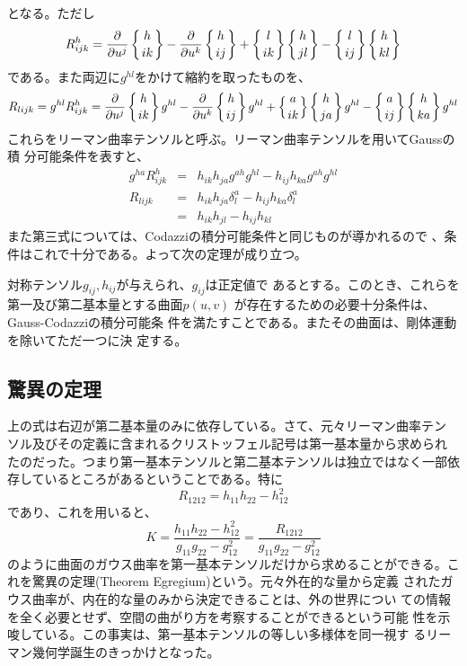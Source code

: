             となる。ただし
                \[R^h_{ijk} = \frac{\partial }{\partial u^j}\left\{h \atop ik\right\} - \frac{\partial }{\partial u^k}\left\{h \atop ij\right\}
                + \left\{l \atop ik\right\}\left\{h \atop jl\right\} - \left\{l \atop ij\right\}\left\{h \atop kl\right\}\]
            である。また両辺に$g^{hl}$をかけて縮約を取ったものを、
                \[R_{lijk} = g^{hl}R^h_{ijk}
                = \frac{\partial }{\partial u^j}\left\{h \atop ik\right\}g^{hl} - \frac{\partial }{\partial u^k}\left\{h \atop ij\right\}g^{hl}
                + \left\{a \atop ik\right\}\left\{h \atop ja\right\}g^{hl} - \left\{a \atop ij\right\}\left\{h \atop ka\right\}g^{hl}\]
            これらをリーマン曲率テンソルと呼ぶ。リーマン曲率テンソルを用いてGaussの積
            分可能条件を表すと、
            \begin{eqnarray*}
                g^{ha}R^h_{ijk} &=& h_{ik}h_{ja}g^{ah}g^{hl} - h_{ij}h_{ka}g^{ah}g^{hl}\\
                R_{lijk} &=& h_{ik}h_{ja}\delta_l^a - h_{ij}h_{ka}\delta_l^a\\
                &=& h_{ik}h_{jl} - h_{ij}h_{kl}
            \end{eqnarray*}
            また第三式については、Codazziの積分可能条件と同じものが導かれるので
            、条件はこれで十分である。よって次の定理が成り立つ。
            \begin{surface}
                対称テンソル$g_{ij},h_{ij}$が与えられ、$g_{ij}$は正定値で
                あるとする。このとき、これらを第一及び第二基本量とする曲面$p(u,v)$
                が存在するための必要十分条件は、Gauss-Codazziの積分可能条
                件を満たすことである。またその曲面は、剛体運動を除いてただ一つに決
                定する。
            \end{surface}


        \subsection{驚異の定理}
            上の式は右辺が第二基本量のみに依存している。さて、元々リーマン曲率テン
            ソル及びその定義に含まれるクリストッフェル記号は第一基本量から求められ
            たのだった。つまり第一基本テンソルと第二基本テンソルは独立ではなく一部依
            存しているところがあるということである。特に
                \[R_{1212} = h_{11}h_{22}-h_{12}^2\]
            であり、これを用いると、
                \[K = \frac{h_{11}h_{22}-h_{12}^2}{g_{11}g_{22}-g_{12}^2}
                = \frac{R_{1212}}{g_{11}g_{22}-g_{12}^2}\]
            のように曲面のガウス曲率を第一基本テンソルだけから求めることができる。こ
            れを驚異の定理(Theorem Egregium)という。元々外在的な量から定義
            されたガウス曲率が、内在的な量のみから決定できることは、外の世界につい
            ての情報を全く必要とせず、空間の曲がり方を考察することができるという可能
            性を示唆している。この事実は、第一基本テンソルの等しい多様体を同一視す
            るリーマン幾何学誕生のきっかけとなった。


